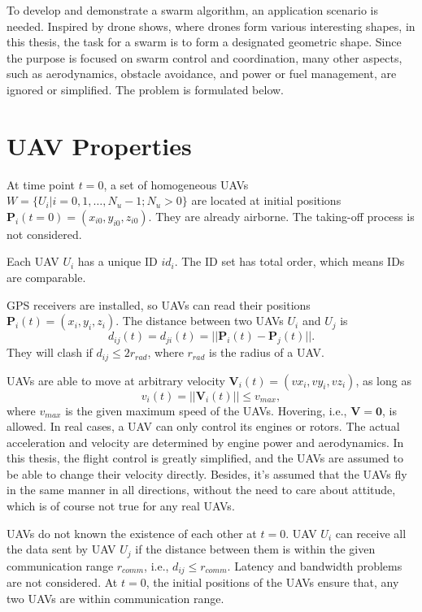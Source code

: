 To develop and demonstrate a swarm algorithm,
an application scenario is needed.
Inspired by drone shows, where drones form various interesting shapes,
in this thesis, the task for a swarm is to form a designated geometric shape.
Since the purpose is focused on swarm control and coordination, many other aspects,
such as aerodynamics, obstacle avoidance, and power or fuel management,
are ignored or simplified.
The problem is formulated below.

\section{UAV Properties}

At time point $t = 0$, a set of homogeneous UAVs
$W = \{U_i | i = 0, 1, \ldots, N_u-1; N_u > 0\}$
are located at initial positions $\bm{P}_i(t=0) = (x_{i0}, y_{i0}, z_{i0})$.
They are already airborne. The taking-off process is not considered.

Each UAV $U_i$ has a unique ID $id_i$.
The ID set has total order, which means IDs are comparable.

GPS receivers are installed, so UAVs can read
their positions $\bm{P}_i(t) = (x_i, y_i, z_i)$.
The distance between two UAVs $U_i$ and $U_j$ is
\begin{equation}
d_{ij}(t) = d_{ji}(t) = ||\bm{P}_i(t) - \bm{P}_j(t)||.
\end{equation}
They will clash if $d_{ij} \leqslant 2 r_{rad}$,
where $r_{rad}$ is the radius of a UAV.

UAVs are able to move at arbitrary velocity $\bm{V}_i(t) = (vx_i, vy_i, vz_i)$,
as long as
\begin{equation}
v_i(t) = ||\bm{V}_i(t)|| \leqslant v_{max},
\end{equation}
where $v_{max}$ is the given maximum speed of the UAVs.
Hovering, i.e., $\bm{V} = \bm{0}$, is allowed.
In real cases, a UAV can only control its engines or rotors.
The actual acceleration and velocity are determined by engine power and aerodynamics.
In this thesis, the flight control is greatly simplified,
and the UAVs are assumed to be able to change their velocity directly.
Besides, it's assumed that the UAVs fly in the same manner in all directions,
without the need to care about attitude,
which is of course not true for any real UAVs.

UAVs do not known the existence of each other at $t = 0$.
UAV $U_i$ can receive all the data sent by UAV $U_j$
if the distance between them is within the given communication range $r_{comm}$,
i.e., $d_{ij} \leqslant r_{comm}$.
Latency and bandwidth problems are not considered.
At $t = 0$, the initial positions of the UAVs ensure that,
any two UAVs are within communication range.

